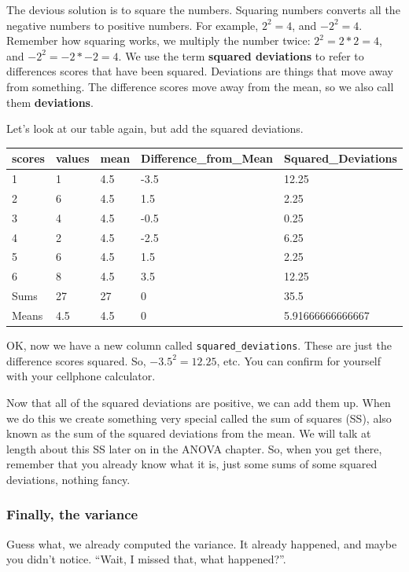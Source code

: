 \documentclass[
]{book}
\begin{document}
The devious solution is to square the numbers. Squaring numbers converts all the negative numbers to positive numbers. For example, \(2^2 = 4\), and \(-2^2 = 4\). Remember how squaring works, we multiply the number twice: \(2^2 = 2*2 = 4\), and \(-2^2 = -2*-2 = 4\). We use the term \textbf{squared deviations} to refer to differences scores that have been squared. Deviations are things that move away from something. The difference scores move away from the mean, so we also call them \textbf{deviations}.

Let's look at our table again, but add the squared deviations.

\begin{tabular}{l|l|l|l|l}
\hline
scores & values & mean & Difference\_from\_Mean & Squared\_Deviations\\
\hline
1 & 1 & 4.5 & -3.5 & 12.25\\
\hline
2 & 6 & 4.5 & 1.5 & 2.25\\
\hline
3 & 4 & 4.5 & -0.5 & 0.25\\
\hline
4 & 2 & 4.5 & -2.5 & 6.25\\
\hline
5 & 6 & 4.5 & 1.5 & 2.25\\
\hline
6 & 8 & 4.5 & 3.5 & 12.25\\
\hline
Sums & 27 & 27 & 0 & 35.5\\
\hline
Means & 4.5 & 4.5 & 0 & 5.91666666666667\\
\hline
\end{tabular}

OK, now we have a new column called \texttt{squared\_deviations}. These are just the difference scores squared. So, \(-3.5^2 = 12.25\), etc. You can confirm for yourself with your cellphone calculator.

Now that all of the squared deviations are positive, we can add them up. When we do this we create something very special called the sum of squares (SS), also known as the sum of the squared deviations from the mean. We will talk at length about this SS later on in the ANOVA chapter. So, when you get there, remember that you already know what it is, just some sums of some squared deviations, nothing fancy.

\subsubsection{Finally, the variance}\label{finally-the-variance}

Guess what, we already computed the variance. It already happened, and maybe you didn't notice. ``Wait, I missed that, what happened?''.
\end{document}
